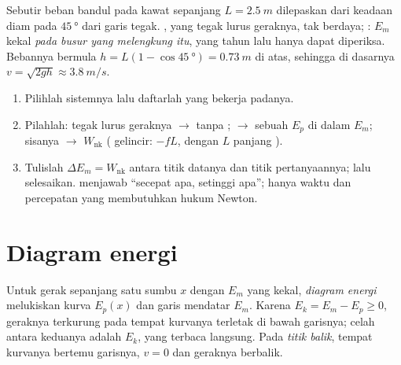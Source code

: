 \begin{example}\label{ex:g12:work-and-energy:pendulum}
Sebutir beban bandul pada kawat sepanjang $L = \qty{2.5}{m}$ dilepaskan dari
keadaan diam pada $\qty{45}{\degree}$ dari garis tegak. , yang
tegak lurus geraknya, tak berdaya;  :
$E_m$ kekal \emph{pada busur yang melengkung itu}, yang tahun lalu hanya
dapat diperiksa. Bebannya bermula $h = L(1 - \cos\qty{45}{\degree}) =
\qty{0.73}{m}$ di atas, sehingga di dasarnya $v = \sqrt{2gh} \approx
\qty{3.8}{m/s}$.
\end{example}

\begin{method}\label{met:g12:work-and-energy:audit}
\begin{enumerate}
  \item Pilihlah sistemnya lalu daftarlah  yang bekerja padanya.
  \item Pilahlah: tegak lurus geraknya $\to$ tanpa ; 
        $\to$ sebuah $E_p$ di dalam $E_m$; sisanya $\to$ $W_{\text{nk}}$
        ( gelincir: $-fL$, dengan $L$ panjang ).
  \item Tulislah $\Delta E_m = W_{\text{nk}}$ antara titik datanya dan
        titik pertanyaannya; lalu selesaikan.  menjawab ``secepat apa,
        setinggi apa''; hanya waktu dan percepatan yang membutuhkan hukum Newton.
\end{enumerate}
\end{method}

\section{Diagram energi}

\begin{definition}\label{def:g12:work-and-energy:diagram}
Untuk gerak sepanjang satu sumbu $x$ dengan $E_m$ yang kekal,
\emph{diagram energi} melukiskan kurva $E_p(x)$
dan garis mendatar $E_m$. Karena $E_k = E_m - E_p \geq 0$,
geraknya terkurung pada tempat kurvanya terletak di bawah garisnya; celah
antara keduanya adalah $E_k$, yang terbaca langsung. Pada
\emph{titik balik}, tempat kurvanya bertemu garisnya,
$v = 0$ dan geraknya berbalik.
\end{definition}

